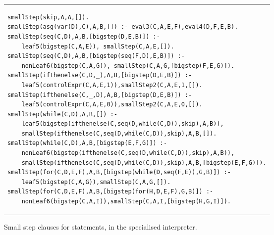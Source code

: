 \documentclass{llncs}
\begin{document}
\begin{figure}
\begin{tabular}{l}
\begin{lstlisting}
smallStep(skip,A,A,[]).
smallStep(asg(var(D),C),A,B,[]) :- eval3(C,A,E,F),eval4(D,F,E,B).
smallStep(seq(C,D),A,B,[bigstep(D,E,B)]) :-
    leaf5(bigstep(C,A,E)), smallStep(C,A,E,[]).
smallStep(seq(C,D),A,B,[bigstep(seq(F,D),E,B)]) :-
    nonLeaf6(bigstep(C,A,G)), smallStep(C,A,G,[bigstep(F,E,G)]).
smallStep(ifthenelse(C,D,_),A,B,[bigstep(D,E,B)]) :-
    leaf5(controlExpr(C,A,E,1)),smallStep2(C,A,E,1,[]).
smallStep(ifthenelse(C,_,D),A,B,[bigstep(D,E,B)]) :-
    leaf5(controlExpr(C,A,E,0)),smallStep2(C,A,E,0,[]).
smallStep(while(C,D),A,B,[]) :-
    leaf5(bigstep(ifthenelse(C,seq(D,while(C,D)),skip),A,B)),
    smallStep(ifthenelse(C,seq(D,while(C,D)),skip),A,B,[]).
smallStep(while(C,D),A,B,[bigstep(E,F,G)]) :-
    nonLeaf6(bigstep(ifthenelse(C,seq(D,while(C,D)),skip),A,B)),
    smallStep(ifthenelse(C,seq(D,while(C,D)),skip),A,B,[bigstep(E,F,G)]).
smallStep(for(C,D,E,F),A,B,[bigstep(while(D,seq(F,E)),G,B)]) :-
    leaf5(bigstep(C,A,G)),smallStep(C,A,G,[]).
smallStep(for(C,D,E,F),A,B,[bigstep(for(H,D,E,F),G,B)]) :-
    nonLeaf6(bigstep(C,A,I)),smallStep(C,A,I,[bigstep(H,G,I)]).

\end{lstlisting}
\end{tabular}
\caption{Small step clauses for statements, in the specialised interpreter.}\label{small-step-while}
\end{figure}
\end{document}
